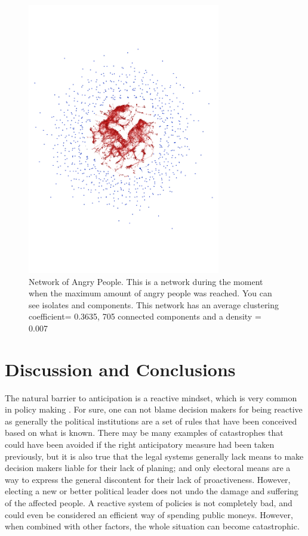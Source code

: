 \documentclass[doc,12pt,floatsintext]{apa7}
\begin{document}
\begin{figure}[h]

  \centering
  \includegraphics[trim = 0cm 5cm 0cm 5cm,clip,width=0.75\textwidth]{network}
  \caption[Network of Angry People]{Network of Angry People. This is a network during the moment when the maximum amount of angry people was reached. You can see isolates and  components. This network has an average clustering coefficient= 0.3635, 705 connected components and a density = 0.007}
  \label{network}
\end{figure}



\section{Discussion and Conclusions}

The natural barrier to anticipation is a reactive mindset, which is very common in policy making \parencite{torjman_what_2005}. For sure, one can not blame decision makers for being reactive as generally the political institutions are a set of rules that have been conceived based on what is known. There may be many examples of catastrophes that could have been avoided if the right anticipatory measure had been taken previously, but it is also true that the legal systems generally lack means to make decision makers liable for their lack of planing; and  only electoral means are a way to express the general discontent for their lack of proactiveness. However, electing a new or better political leader does not undo the damage and suffering of the affected people. A reactive system of policies is not completely bad, and could even be considered an efficient way of spending public moneys. However, when combined with other factors, the whole situation can become catastrophic.
\end{document}
